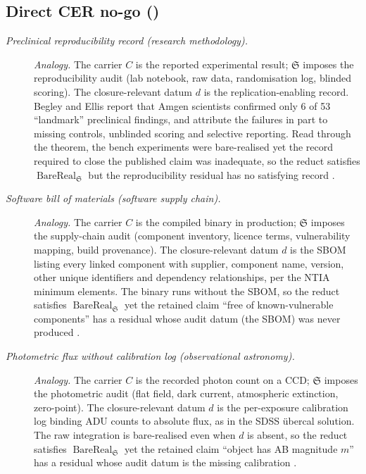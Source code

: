 \subsection*{Direct CER no-go ()}
\begingroup\small
\begin{description}
\item[\emph{Preclinical reproducibility record
(research methodology).}] \textit{Analogy.}
The carrier \(C\) is the reported experimental
result; \(\mathfrak S\) imposes the
reproducibility audit (lab notebook, raw data,
randomisation log, blinded scoring).  The
closure-relevant datum \(d\) is the
replication-enabling record.  Begley and Ellis
report that Amgen scientists confirmed only 6 of 53 ``landmark''
preclinical findings, and attribute the failures in part to missing
controls, unblinded scoring and selective reporting.  Read through
the theorem, the bench experiments were bare-realised yet the record
required to close the published claim was inadequate, so the
reduct satisfies \(\operatorname{BareReal}
_{\mathfrak S}\) but the reproducibility
residual has no satisfying record
\citep{Begley2012Drug}.

\item[\emph{Software bill of materials (software
supply chain).}] \textit{Analogy.}
The carrier \(C\) is the compiled binary in
production; \(\mathfrak S\) imposes the
supply-chain audit (component inventory, licence
terms, vulnerability mapping, build provenance).
The closure-relevant datum \(d\) is the SBOM
listing every linked component with supplier, component name, version, other unique identifiers and dependency relationships, per the NTIA minimum elements.
The binary runs without the SBOM, so the reduct
satisfies \(\operatorname{BareReal}_{\mathfrak S}\)
yet the retained claim ``free of
known-vulnerable components'' has a residual
whose audit datum (the SBOM) was never produced
\citep{NTIA2021SBOM}.

\item[\emph{Photometric flux without calibration
log (observational astronomy).}] \textit{Analogy.}
The carrier \(C\) is the recorded photon count on
a CCD; \(\mathfrak S\) imposes the photometric
audit (flat field, dark current, atmospheric
extinction, zero-point).  The closure-relevant
datum \(d\) is the per-exposure calibration log
binding ADU counts to absolute flux, as in the
SDSS \"ubercal solution.  The raw integration is
bare-realised even when \(d\) is absent, so the
reduct satisfies \(\operatorname{BareReal}
_{\mathfrak S}\) yet the retained claim ``object
has AB magnitude \(m\)'' has a residual whose
audit datum is the missing calibration
\citep{Padmanabhan2008Improved}.


\end{description}
